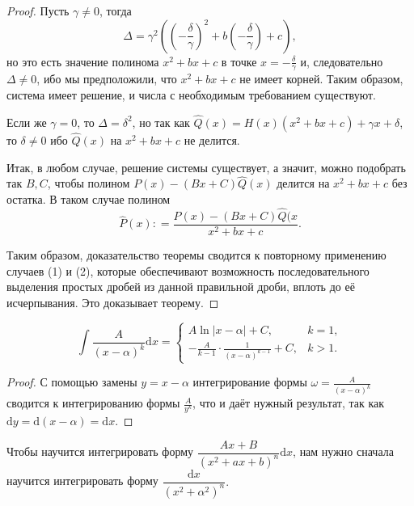 \begin{proof}
Пусть $\gamma \ne 0$, тогда
\[
 \Delta = \gamma^2 \left( \left( -\frac{\delta}{\gamma} \right)^2 + b \left(-\frac{\delta}{\gamma}\right) + c \right),
\]
но это есть значение полинома $x^2 + bx +c$ в точке $x = -\frac{\delta}{\gamma}$ и, следовательно $\Delta \ne 0$, ибо мы предположили, что $x^2 + bx +c$ не имеет корней. Таким образом, система имеет решение, и числа с необходимым требованием существуют. 

Если же $\gamma =0$, то $\Delta = \delta^2$, но так как $\widehat{Q}(x) = H(x)(x^2 + bx + c) + \gamma x + \delta$, то $\delta \ne 0$ ибо $\widehat{Q}(x)$ на $x^2 + bx +c$ не делится.

Итак, в любом случае, решение системы существует, а значит, можно подобрать так $B,C$, чтобы полином $P(x) - (Bx + C)\widehat{Q}(x)$ делится на $x^2 + bx + c$ без остатка. В таком случае полином
\[
 \widehat{P}(x): = \frac{P(x) - (Bx + C)\widehat{Q}(x}{x^2 + bx + c}.
\]

Таким образом, доказательство теоремы сводится к повторному применению случаев (1) и (2), которые обеспечивают возможность последовательного выделения простых дробей из данной правильной дроби, вплоть до её исчерпывания. Это доказывает теорему.
\end{proof}





\begin{lemma}\label{int_of_(x-a)^{-k}}
    \[
     \int \frac{A}{(x-\alpha)^k} \mathrm{d}x = \begin{cases}
         A \ln|x-\alpha| + C, & k =1,\\
         - \frac{A}{k-1}\cdot \frac{1}{(x-\alpha)^{k-1}} + C, & k >1.
     \end{cases}
    \]
\end{lemma}
\begin{proof}
    С помощью замены $y =x-\alpha$ интегрирование формы $\omega = \frac{A}{(x-\alpha)^k}$ сводится к интегрированию формы $\frac{A}{y^k}$, что и даёт нужный результат, так как $\mathrm{d}y = \mathrm{d}(x-\alpha) = \mathrm{d}x.$
\end{proof}

Чтобы научится интегрировать форму $\dfrac{Ax + B}{(x^2 + ax + b)^n} \mathrm{d}x$, нам нужно сначала научится интегрировать форму $\dfrac{\mathrm{d}x}{(x^2 + \alpha^2)^n}.$

